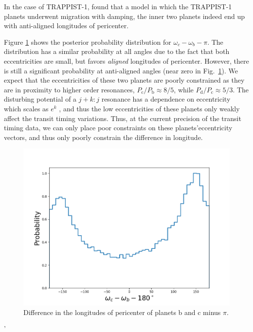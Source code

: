 \documentclass[fleqn,usenatbib]{mnras} %
\begin{document}
In the case of TRAPPIST-1, \citet{Papaloizou2017} found that a model
in which the TRAPPIST-1 planets underwent migration with damping, the
inner two planets indeed end up with anti-aligned longitudes of pericenter.

Figure \ref{fig:delta_omega} shows the posterior probability distribution
for $\omega_c-\omega_b-\pi$.   The distribution has a similar probability
at all angles due to the fact that both eccentricities are small, but 
favors {\it aligned} longitudes of pericenter.  However,
there is still a significant probability at anti-aligned angles (near
zero in Fig.\ \ref{fig:delta_omega}).   We expect that the eccentricities
of these two planets are poorly constrained as they are in proximity
to higher order resonances, $P_\mathrm{c}/P_\mathrm{b} \approx 8/5$, while $P_\mathrm{d}/P_\mathrm{c} \approx
5/3$.  The disturbing potential of a $j+k:j$ resonance has a dependence on 
eccentricity which scales as $e^k$ \citep{Deck2016}, and thus the low eccentricities of 
these planets only weakly affect the transit timing variations.  Thus, at 
the current precision of the transit timing data, we can only place poor 
constraints on these planets'eccentricity vectors, and thus only poorly constrain
the difference in longitude.

\begin{figure}
    \centering
    \includegraphics[width=\hsize]{figures/delta_omega_bc.png}
    \caption{Difference in the longitudes of pericenter of planets b and
    c minus $\pi$.}
    \label{fig:delta_omega}
\end{figure}'
\end{document}
